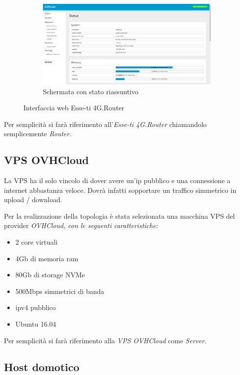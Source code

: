 \begin{figure}[H]
	\begin{subfigure}[b]{\textwidth}
		\centering%
		\includegraphics[totalheight=1.8\tempheight]{immagini/interfacciar4g_status}
		\caption{Schermata con stato riassuntivo}
	\end{subfigure}
	\caption{Interfaccia web Esse-ti 4G.Router}

\end{figure}

Per semplicità si farà riferimento all'\textit{Esse-ti 4G.Router} chiamandolo semplicemente \it{Router}.

\subsection{VPS OVHCloud}

La VPS ha il solo vincolo di dover avere un'ip pubblico e una connessione a internet abbastanza veloce. Dovrà infatti sopportare un traffico simmetrico in upload / download.

Per la realizzazione della topologia è stata selezionata una macchina VPS del provider \it{OVHCloud}, con le seguenti caratteristiche:

\begin{itemize}
	\item 2 core virtuali
	\item 4Gb di memoria ram
	\item 80Gb di storage NVMe
	\item 500Mbps simmetrici di banda
	\item ipv4 pubblico
	\item Ubuntu 16.04
\end{itemize}

Per semplicità si farà riferimento alla \textit{VPS OVHCloud} come \it{Server}.

\subsection{Host domotico}

